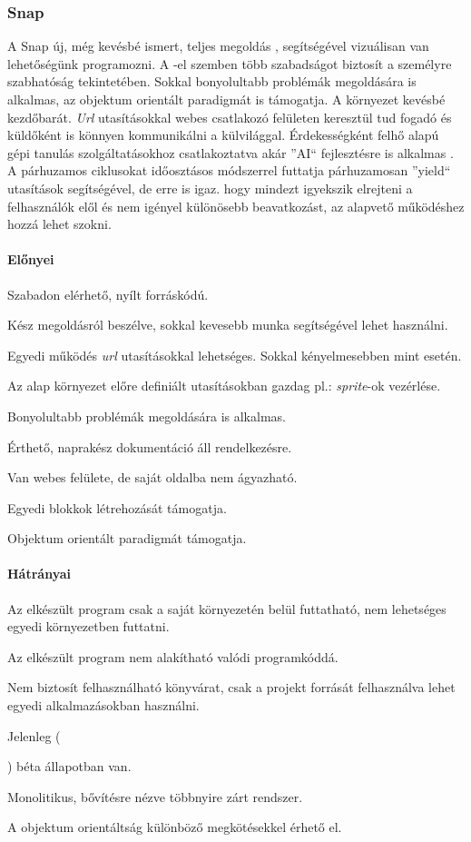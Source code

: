 \documentclass[12pt,a4paper,oneside]{report} %
\begin{document}
\subsubsection{Snap} \label{snap}A Snap új, még kevésbé  ismert, teljes megoldás \cite{harvey2013snap}, segítségével vizuálisan van lehetőségünk programozni. A -el szemben több szabadságot biztosít a személyre szabhatóság tekintetében. Sokkal bonyolultabb problémák megoldására is alkalmas, az objektum orientált paradigmát is támogatja. A környezet kevésbé kezdőbarát. \textit{Url} utasításokkal webes  csatlakozó felületen keresztül tud fogadó és küldőként is könnyen kommunikálni a külvilággal. Érdekességként felhő alapú gépi tanulás szolgáltatásokhoz csatlakoztatva akár ''AI`` fejlesztésre is alkalmas \cite{kahn2018ai}. A párhuzamos ciklusokat időosztásos módszerrel futtatja párhuzamosan ''yield`` utasítások segítségével, de erre is igaz. hogy mindezt igyekszik elrejteni a felhasználók elől és nem igényel különösebb beavatkozást, az alapvető működéshez hozzá lehet szokni.
\paragraph{Előnyei} 
\begin{compactitem}
	\item Szabadon elérhető, nyílt forráskódú.
	\item Kész megoldásról beszélve, sokkal kevesebb munka segítségével lehet használni.
	\item Egyedi működés \textit{url} utasításokkal lehetséges. Sokkal kényelmesebben mint  esetén.
	\item Az alap környezet előre definiált utasításokban gazdag pl.: \textit{sprite}-ok vezérlése.
	\item Bonyolultabb problémák megoldására is alkalmas.
	\item Érthető, naprakész dokumentáció áll rendelkezésre.
	\item Van webes felülete, de saját oldalba nem ágyazható.
	\item Egyedi blokkok létrehozását támogatja.
	\item Objektum orientált paradigmát támogatja.
\end{compactitem}
\paragraph{Hátrányai} 
\begin{compactitem}
	\item Az elkészült program csak a saját környezetén belül futtatható, nem lehetséges egyedi környezetben futtatni.
	\item Az elkészült program nem alakítható valódi programkóddá.
	\item Nem biztosít felhasználható könyvárat, csak a projekt forrását felhasználva lehet egyedi alkalmazásokban használni.
	\item Jelenleg (\date{\today}) béta állapotban van.
	\item Monolitikus, bővítésre nézve többnyire zárt rendszer.
	\item A objektum orientáltság különböző megkötésekkel érhető el.
\end{compactitem}
\end{document}
